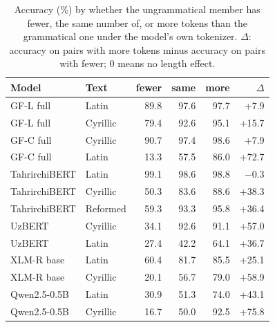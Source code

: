 \begin{table}[t]
\centering\small
\setlength{\tabcolsep}{4pt}
\begin{tabular}{@{}llrrrr@{}}
\toprule
Model & Text & fewer & same & more & $\Delta$ \\
\midrule
GF-L full & Latin & 89.8 & 97.6 & 97.7 & +7.9 \\
GF-L full & Cyrillic & 79.4 & 92.6 & 95.1 & +15.7 \\
GF-C full & Cyrillic & 90.7 & 97.4 & 98.6 & +7.9 \\
GF-C full & Latin & 13.3 & 57.5 & 86.0 & +72.7 \\
TahrirchiBERT & Latin & 99.1 & 98.6 & 98.8 & $-$0.3 \\
TahrirchiBERT & Cyrillic & 50.3 & 83.6 & 88.6 & +38.3 \\
TahrirchiBERT & Reformed & 59.3 & 93.3 & 95.8 & +36.4 \\
UzBERT & Cyrillic & 34.1 & 92.6 & 91.1 & +57.0 \\
UzBERT & Latin & 27.4 & 42.2 & 64.1 & +36.7 \\
XLM-R base & Latin & 60.4 & 81.7 & 85.5 & +25.1 \\
XLM-R base & Cyrillic & 20.1 & 56.7 & 79.0 & +58.9 \\
Qwen2.5-0.5B & Latin & 30.9 & 51.3 & 74.0 & +43.1 \\
Qwen2.5-0.5B & Cyrillic & 16.7 & 50.0 & 92.5 & +75.8 \\
\bottomrule
\end{tabular}
\caption{Accuracy (\%) by whether the ungrammatical member has fewer, the same number of, or more tokens than the grammatical one under the model's own tokenizer. $\Delta$: accuracy on pairs with more tokens minus accuracy on pairs with fewer; 0 means no length effect.}
\label{tab:length}
\end{table}
